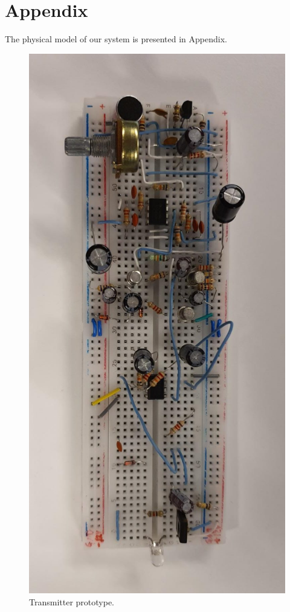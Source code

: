 \documentclass[a4paper,10pt]{IEEEtran}
\begin{document}
\section*{Appendix}
The physical model of our system is presented in Appendix.
\begin{figure}[htbp!]
    \centering
    \includegraphics[width = 1\linewidth]{transmitter.jpeg}
    \caption{Transmitter prototype.}
    \label{transmitter_breadboard}
\end{figure} 
\end{document}
